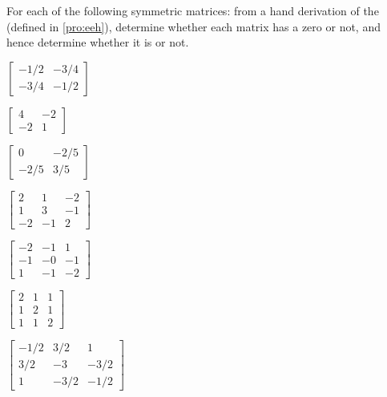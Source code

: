\begin{exercise}  
For each of the following symmetric matrices: from a hand derivation of the  (defined in \autoref{pro:eeh}), determine whether each matrix has a zero  or not, and hence determine whether it is  or not.
\begin{Parts}
\item \(\begin{bmatrix} -1/2 & -3/4
\\ -3/4 & -1/2 \end{bmatrix}\)

\item \(\begin{bmatrix} 4 & -2
\\ -2 & 1 \end{bmatrix}\)

\item \(\begin{bmatrix} 0 & -2/5
\\ -2/5 & 3/5 \end{bmatrix}\)

\item \(\begin{bmatrix} 2 & 1 & -2
\\ 1 & 3 & -1
\\ -2 & -1 & 2 \end{bmatrix}\)

\begin{reduce}
\item \(\begin{bmatrix} -2 & -1 & 1
\\ -1 & -0 & -1
\\ 1 & -1 & -2 \end{bmatrix}\)

\item \(\begin{bmatrix} 2 & 1 & 1
\\ 1 & 2 & 1
\\ 1 & 1 & 2 \end{bmatrix}\)

\item \(\begin{bmatrix} -1/2 & 3/2 & 1
\\ 3/2 & -3 & -3/2
\\ 1 & -3/2 & -1/2 \end{bmatrix}\)


\end{reduce}
\end{Parts}
\end{exercise}
